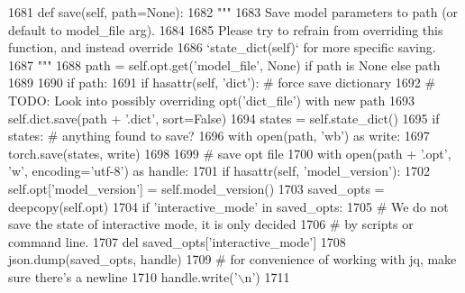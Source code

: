 \begin{DoxyCode}
1681     \textcolor{keyword}{def }save(self, path=None):
1682         \textcolor{stringliteral}{"""}
1683 \textcolor{stringliteral}{        Save model parameters to path (or default to model\_file arg).}
1684 \textcolor{stringliteral}{}
1685 \textcolor{stringliteral}{        Please try to refrain from overriding this function, and instead override}
1686 \textcolor{stringliteral}{        `state\_dict(self)` for more specific saving.}
1687 \textcolor{stringliteral}{        """}
1688         path = self.opt.get(\textcolor{stringliteral}{'model\_file'}, \textcolor{keywordtype}{None}) \textcolor{keywordflow}{if} path \textcolor{keywordflow}{is} \textcolor{keywordtype}{None} \textcolor{keywordflow}{else} path
1689 
1690         \textcolor{keywordflow}{if} path:
1691             \textcolor{keywordflow}{if} hasattr(self, \textcolor{stringliteral}{'dict'}):  \textcolor{comment}{# force save dictionary}
1692                 \textcolor{comment}{# TODO: Look into possibly overriding opt('dict\_file') with new path}
1693                 self.dict.save(path + \textcolor{stringliteral}{'.dict'}, sort=\textcolor{keyword}{False})
1694             states = self.state\_dict()
1695             \textcolor{keywordflow}{if} states:  \textcolor{comment}{# anything found to save?}
1696                 with open(path, \textcolor{stringliteral}{'wb'}) \textcolor{keyword}{as} write:
1697                     torch.save(states, write)
1698 
1699                 \textcolor{comment}{# save opt file}
1700                 with open(path + \textcolor{stringliteral}{'.opt'}, \textcolor{stringliteral}{'w'}, encoding=\textcolor{stringliteral}{'utf-8'}) \textcolor{keyword}{as} handle:
1701                     \textcolor{keywordflow}{if} hasattr(self, \textcolor{stringliteral}{'model\_version'}):
1702                         self.opt[\textcolor{stringliteral}{'model\_version'}] = self.model\_version()
1703                     saved\_opts = deepcopy(self.opt)
1704                     \textcolor{keywordflow}{if} \textcolor{stringliteral}{'interactive\_mode'} \textcolor{keywordflow}{in} saved\_opts:
1705                         \textcolor{comment}{# We do not save the state of interactive mode, it is only decided}
1706                         \textcolor{comment}{# by scripts or command line.}
1707                         del saved\_opts[\textcolor{stringliteral}{'interactive\_mode'}]
1708                     json.dump(saved\_opts, handle)
1709                     \textcolor{comment}{# for convenience of working with jq, make sure there's a newline}
1710                     handle.write(\textcolor{stringliteral}{'\(\backslash\)n'})
1711 
\end{DoxyCode}
\mbox{\label{classparlai_1_1core_1_1torch__agent_1_1TorchAgent_a6a7aff29231816a0f3cade9c72409dfc}} 
